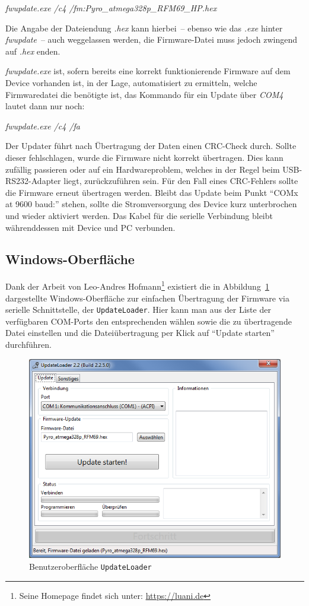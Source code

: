 \documentclass[paper=a4, parskip, numbers=noenddot, toc=listof, headsepline]{scrbook}
\begin{document}
				\begin{center}
					\emph{fwupdate.exe /c4 /fm:Pyro\_atmega328p\_RFM69\_HP.hex}
				\end{center}

				Die Angabe der Dateiendung \emph{.hex} kann hierbei~-- ebenso wie das \emph{.exe} hinter \emph{fwupdate}~-- auch weggelassen werden, die Firmware-Datei muss jedoch zwingend auf \emph{.hex} enden.

				\emph{fwupdate.exe} ist, sofern bereits eine korrekt funktionierende Firmware auf dem Device vorhanden ist, in der Lage, automatisiert zu ermitteln, welche Firmwaredatei die benötigte ist, das Kommando für ein Update über \emph{COM4} lautet dann nur noch:

				\begin{center}
					\emph{fwupdate.exe /c4 /fa}
				\end{center}

				Der Updater führt nach Übertragung der Daten einen CRC-Check durch. Sollte dieser fehlschlagen, wurde die Firmware nicht korrekt übertragen. Dies kann zufällig passieren oder auf ein Hardwareproblem, welches in der Regel beim USB-RS232-Adapter liegt, zurückzuführen sein. Für den Fall eines CRC-Fehlers sollte die Firmware erneut übertragen werden. Bleibt das Update beim Punkt \enquote{COMx at 9600 baud:} stehen, sollte die Stromversorgung des Device kurz unterbrochen und wieder aktiviert werden. Das Kabel für die serielle Verbindung bleibt währenddessen mit Device und PC verbunden.

			\subsection{Windows-Oberfläche}

				Dank der Arbeit von Leo-Andres Hofmann\footnote{Seine Homepage findet sich unter: \url{https://luani.de}} existiert die in Abbildung~\ref{fig:updateloader} dargestellte Windows-Oberfläche zur einfachen Übertragung der Firmware via serielle Schnittstelle, der \texttt{UpdateLoader}. Hier kann man aus der Liste der verfügbaren COM-Ports den entsprechenden wählen sowie die zu übertragende Datei einstellen und die Dateiübertragung per Klick auf \enquote{Update starten} durchführen.

				\begin{figure}[!h]
					\centering
					\includegraphics[width = .66\textwidth]{Bilder/updateloader.png}
					\caption{Benutzeroberfläche \texttt{UpdateLoader}}
					\label{fig:updateloader}
				\end{figure}
\end{document}
